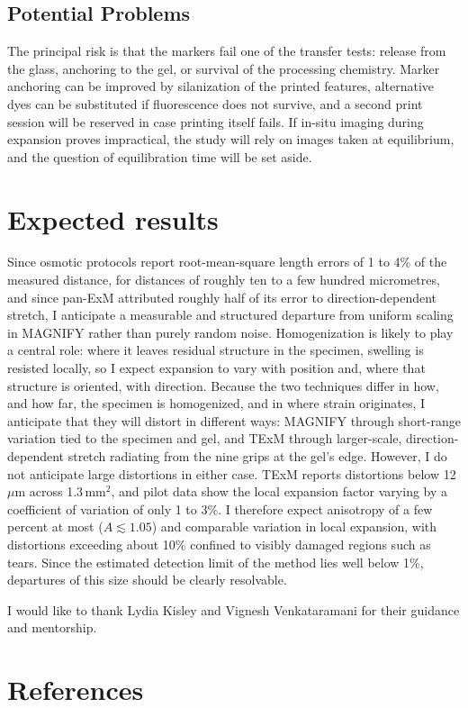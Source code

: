 \documentclass[%
 reprint,
 11pt,
 amsmath,amssymb,
 aps,
]{revtex4-2}
\begin{document}
\subsection{Potential Problems}

The principal risk is that the markers fail one of the transfer tests: release from the glass, anchoring to the gel, or survival of the processing chemistry. Marker anchoring can be improved by silanization of the printed features, alternative dyes can be substituted if fluorescence does not survive, and a second print session will be reserved in case printing itself fails. If in-situ imaging during expansion proves impractical, the study will rely on images taken at equilibrium, and the question of equilibration time will be set aside.

\section{Expected results}

Since osmotic protocols report root-mean-square length errors of 1 to 4\% of the measured distance, for distances of roughly ten to a few hundred micrometres,\cite{exm,panexm,magnify} and since pan-ExM attributed roughly half of its error to direction-dependent stretch,\cite{panexm} I anticipate a measurable and structured departure from uniform scaling in MAGNIFY\cite{magnify} rather than purely random noise. Homogenization is likely to play a central role: where it leaves residual structure in the specimen, swelling is resisted locally,\cite{gao,magnify} so I expect expansion to vary with position and, where that structure is oriented, with direction. Because the two techniques differ in how, and how far, the specimen is homogenized, and in where strain originates,\cite{magnify,texm} I anticipate that they will distort in different ways: MAGNIFY through short-range variation tied to the specimen and gel, and TExM through larger-scale, direction-dependent stretch radiating from the nine grips at the gel's edge. However, I do not anticipate large distortions in either case. TExM reports distortions below 12\,$\mu$m across 1.3\,mm$^2$,\cite{texm} and pilot data show the local expansion factor varying by a coefficient of variation of only 1 to 3\%. I therefore expect anisotropy of a few percent at most ($A \lesssim 1.05$) and comparable variation in local expansion, with distortions exceeding about 10\% confined to visibly damaged regions such as tears. Since the estimated detection limit of the method lies well below 1\%, departures of this size should be clearly resolvable.

\begin{acknowledgments}
I would like to thank Lydia Kisley and Vignesh Venkataramani for their guidance and mentorship.
\end{acknowledgments}



\section{References}

\end{document}
